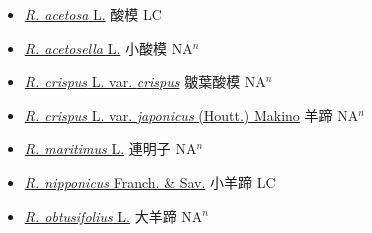 \begin{itemize}
  \begin{itemize}
        \item[] \href{http://www.theplantlist.org/tpl1.1/search?q=Rumex+acetosa}{\textit{R. acetosa} L.}   酸模 LC
        \item[] \href{http://www.theplantlist.org/tpl1.1/search?q=Rumex+acetosella}{\textit{R. acetosella} L.}   小酸模 NA$^n$
        \item[] \href{http://www.theplantlist.org/tpl1.1/search?q=Rumex+crispus+var.+crispus}{\textit{R. crispus} L. var. \textit{crispus}}   皺葉酸模 NA$^n$
        \item[] \href{http://www.theplantlist.org/tpl1.1/search?q=Rumex+crispus+var.+japonicus}{\textit{R. crispus} L. var. \textit{japonicus} (Houtt.) Makino}   羊蹄 NA$^n$
        \item[] \href{http://www.theplantlist.org/tpl1.1/search?q=Rumex+maritimus}{\textit{R. maritimus} L.}   連明子 NA$^n$
        \item[] \href{http://www.theplantlist.org/tpl1.1/search?q=Rumex+nipponicus}{\textit{R. nipponicus} Franch. \& Sav.}   小羊蹄 LC
        \item[] \href{http://www.theplantlist.org/tpl1.1/search?q=Rumex+obtusifolius}{\textit{R. obtusifolius} L.}   大羊蹄 NA$^n$
  \end{itemize}
  \end{itemize}
